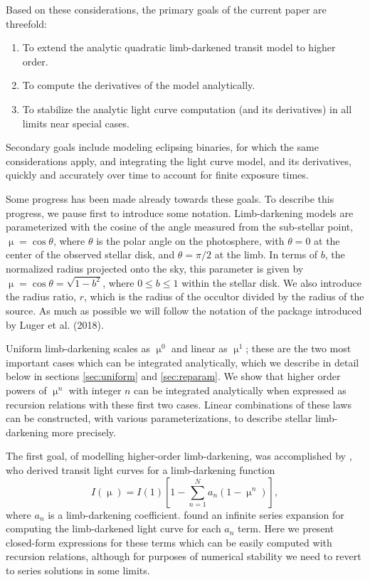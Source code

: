 \documentclass[modern]{aastex61}
\begin{document}
Based on these considerations, the primary goals of the current paper are
threefold:
\begin{enumerate}
\item To extend the analytic quadratic limb-darkened transit model to higher order.
\item To compute the derivatives of the model analytically.
\item To stabilize the analytic light curve computation (and its derivatives)
in all limits near special cases.
\end{enumerate}
Secondary goals include modeling eclipsing binaries, for which the same
considerations apply, and integrating the light curve model, and its
derivatives, quickly and accurately over time to account for finite
exposure times.

Some progress has been made already towards these goals.  To describe this
progress, we pause first to introduce some notation.  Limb-darkening models are
parameterized with the cosine of the angle measured from the sub-stellar point, 
$\upmu = \cos{\theta}$, where $\theta$ is the polar angle on the photosphere, 
with $\theta=0$ at the center of the observed stellar disk, and $\theta=\pi/2$ 
at the limb.  In terms of $b$, the normalized radius projected onto the sky,
this parameter is given by $\upmu = \cos{\theta} =\sqrt{1-b^2}$, where 
$0\le b \le 1$ within the stellar disk.  We also introduce the radius ratio,
$r$, which is the radius of the occultor divided by the radius of the source.
As much as possible we will follow the notation of the \starry package
introduced by Luger et al. (2018).

Uniform limb-darkening scales as $\upmu^0$ and linear as $\upmu^1$;
these are the two most important cases which can be integrated analytically, 
which we describe in detail below in sections \ref{sec:uniform} and 
\ref{sec:reparam}.  We show that higher order powers of $\upmu^n$ with integer 
$n$ can be integrated analytically when expressed as recursion relations with 
these first two cases.  Linear combinations of these laws can be constructed,
with various parameterizations, to describe stellar limb-darkening more precisely.

The first goal, of modelling higher-order limb-darkening, was accomplished
by \citet{Gimenez2006}, who derived transit light curves for a limb-darkening
function
\begin{equation}
I(\upmu) = I(1) \left[1-\sum_{n=1}^N a_n (1-\upmu^n) \right],
\end{equation}
where $a_n$ is a limb-darkening coefficient.  \cite{Gimenez2006}
found an infinite series expansion for computing the limb-darkened light curve 
for each $a_n$ term.  Here we present closed-form expressions for these terms 
which can be easily computed with recursion relations, although for purposes
of numerical stability we need to revert to series solutions in some limits.
\end{document}
